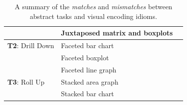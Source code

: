 \documentclass[journal]{vgtc}                %
\newcommand*\match{\textcolor{darkGreen}{\ding{52}}}
\newcommand*\mismatch{\textcolor{red}{\ding{54}}}
\begin{document}
\begin{table}[ht]
\begin{center}
\begin{tabular}{l|l|c}
        \rowcolor{gray!15}
        
        
        & Juxtaposed matrix and boxplots 
        
        & \match
        
        \\
        
        
        \hline
        
        
        {\bf T2}: Drill Down 
        
        & Faceted bar chart 
        
        & \match
        
        \\
        
        \rowcolor{gray!15}
        
        
        & Faceted boxplot 
        
        & \mismatch
        
        \\
        
        
        & Faceted line graph 
        
        & \match
        
        \\
        
        \rowcolor{gray!15}
        
        \hline
        
        {\bf T3}: Roll Up 
        
        & Stacked area graph 
        
        & \match
        
        \\
        
        
        & Stacked bar chart 
        
        & \match
        
        \\
        
        \hline  
        
    \end{tabular}
    \vspace{-0.15cm}
    \caption{A summary of the \textsl{matches} and \textsl{mismatches} between abstract tasks and visual encoding idioms.}
    \label{tab:matches-mismatches}
    \end{center}
    \vspace{-0.6cm}
\end{table}
\end{document}
